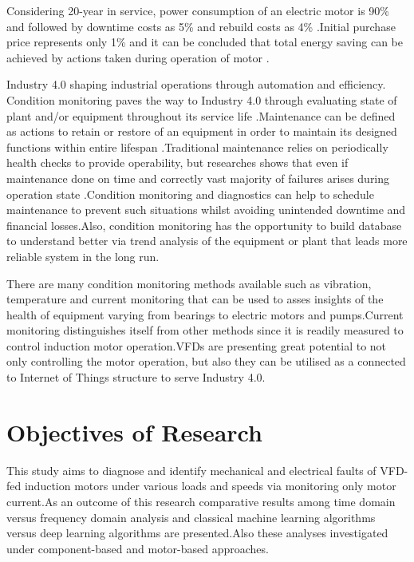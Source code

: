 Considering 20-year in service, power consumption of an electric motor is 90\% and followed by downtime costs as 5\% and rebuild costs as 4\% \cite{waide2011energy}.Initial purchase price represents only 1\% and it can be concluded that total energy saving can be achieved by actions taken during operation of motor \cite{waide2011energy}.

Industry 4.0 shaping industrial operations through automation and efficiency. Condition monitoring paves the way to Industry 4.0 through evaluating state of plant and/or equipment throughout its service life \cite{en201713306}.Maintenance can be defined as actions to retain or restore of an equipment in order to maintain its designed functions within entire lifespan \cite{en201713306}.Traditional maintenance relies on periodically health checks to provide operability, but researches shows that even if maintenance done on time and correctly vast majority of failures arises during operation state \cite{motor1985report}.Condition monitoring and diagnostics can help to schedule maintenance to prevent such situations whilst avoiding unintended downtime and financial losses.Also, condition monitoring has the opportunity to build database to understand better via trend analysis of the equipment or plant that leads more reliable system in the long run. 

There are many condition monitoring methods available such as vibration, temperature and current monitoring that can be used to asses insights of the health of equipment varying from bearings to electric motors and pumps.Current monitoring distinguishes itself from other methods since it is readily measured to control induction motor operation.VFDs are presenting great potential to not only controlling the motor operation, but also they can be utilised as a connected to Internet of Things structure to serve Industry 4.0.

\section{Objectives of Research}
\label{objectives}

This study aims to diagnose and identify mechanical and electrical faults of VFD-fed induction motors under various loads and speeds via monitoring only motor current.As an outcome of this research comparative results among time domain versus frequency domain analysis and classical machine learning algorithms versus deep learning algorithms are presented.Also these analyses investigated under component-based and motor-based approaches.


